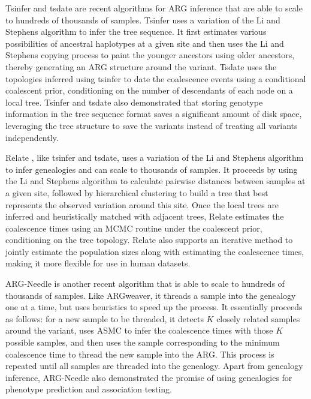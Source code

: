 Tsinfer \cite{Kelleher2019} and tsdate \cite{wohns2022unified} are recent algorithms for ARG inference that are able to scale to hundreds of thousands of samples. Tsinfer uses a variation of the Li and Stephens algorithm to infer the tree sequence. It first estimates various possibilities of ancestral haplotypes at a given site and then uses the Li and Stephens copying process to paint the younger ancestors using older ancestors, thereby generating an ARG structure around the variant. Tsdate uses the topologies inferred using tsinfer to date the coalescence events using a conditional coalescent prior, conditioning on the number of descendants of each node on a local tree. Tsinfer and tsdate also demonstrated that storing genotype information in the tree sequence format saves a significant amount of disk space, leveraging the tree structure to save the variants instead of treating all variants independently.

Relate \cite{speidel2019method}, like tsinfer and tsdate, uses a variation of the Li and Stephens algorithm to infer genealogies and can scale to thousands of samples. It proceeds by using the Li and Stephens algorithm to calculate pairwise distances between samples at a given site, followed by hierarchical clustering to build a tree that best represents the observed variation around this site. Once the local trees are inferred and heuristically matched with adjacent trees, Relate estimates the coalescence times using an MCMC routine under the coalescent prior, conditioning on the tree topology. Relate also supports an iterative method to jointly estimate the population sizes along with estimating the coalescence times, making it more flexible for use in human datasets.

ARG-Needle \cite{zhang2023biobank} is another recent algorithm that is able to scale to hundreds of thousands of samples. Like ARGweaver, it threads a sample into the genealogy one at a time, but uses heuristics to speed up the process. It essentially proceeds as follows: for a new sample to be threaded, it detects \(K\) closely related samples around the variant, uses ASMC \cite{palamara2018high} to infer the coalescence times with those \(K\) possible samples, and then uses the sample corresponding to the minimum coalescence time to thread the new sample into the ARG. This process is repeated until all samples are threaded into the genealogy. Apart from genealogy inference, ARG-Needle also demonstrated the promise of using genealogies for phenotype prediction and association testing.

